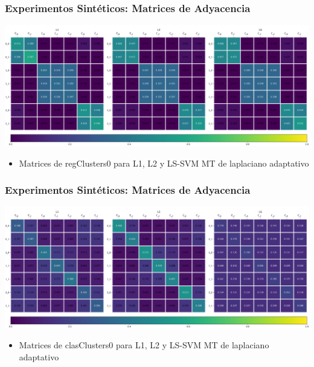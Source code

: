 \documentclass[aspectratio=43,spanish]{beamer}
\newcommand{\fdata}[1]{\textsf{#1}}
\begin{document}
\begin{frame}
      \frametitle{Experimentos Sintéticos: Matrices de Adyacencia}
      
      \centering
      \includegraphics[width=.95\textwidth]{Chapter6/IGPL2022/adjMatrix_all__regClusters_0_crop.pdf}

      \begin{itemize}
            \item Matrices de \fdata{regClusters0} para L1, L2 y LS-SVM MT de laplaciano adaptativo
      \end{itemize}
      

\end{frame}

\begin{frame}
      \frametitle{Experimentos Sintéticos: Matrices de Adyacencia}
      \centering
      \includegraphics[width=.95\textwidth]{Chapter6/IGPL2022/adjMatrix_all__clasClusters_0_crop.pdf}

      \begin{itemize}
            \item Matrices de \fdata{clasClusters0} para L1, L2 y LS-SVM MT de laplaciano adaptativo
      \end{itemize}      

\end{frame}
\end{document}
